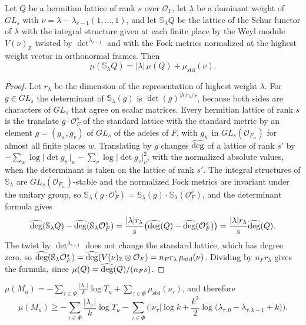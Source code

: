 \begin{lemma}\label{r4:R4:schur}
Let $Q$ be a hermitian lattice of rank $s$ over $\mathcal O_F$, let $\lambda$ be a dominant weight of $GL_s$ with $\nu=\lambda-\lambda_{s-1}(1,\dots,1)$, and let $\mathbb S_\lambda Q$ be the lattice of the Schur functor of $\lambda$ with the integral structure given at each finite place by the Weyl module $V(\nu)_{\mathbb Z}$ twisted by $\det^{\lambda_{s-1}}$ and with the Fock metrics normalized at the highest weight vector in orthonormal frames. Then
\[
\mu(\mathbb S_\lambda Q)=\lvert\lambda\rvert\,\mu(Q)+\mu_{\mathrm{std}}(\nu).
\]
\end{lemma}

\begin{proof}
Let $r_\lambda$ be the dimension of the representation of highest weight $\lambda$. For $g\in GL_s$ the determinant of $\mathbb S_\lambda(g)$ is $\det(g)^{\lvert\lambda\rvert r_\lambda/s}$, because both sides are characters of $GL_s$ that agree on scalar matrices. Every hermitian lattice of rank $s$ is the translate $g\cdot\mathcal O_F^s$ of the standard lattice with the standard metric by an element $g=(g_w,g_v)$ of $GL_s$ of the adeles of $F$, with $g_w$ in $GL_s(\mathcal O_{F_w})$ for almost all finite places $w$. Translating by $g$ changes $\widehat{\deg}$ of a lattice of rank $s'$ by $-\sum_w\log\lvert\det g_w\rvert_w-\sum_v\log\lvert\det g_v\rvert_v^2$, with the normalized absolute values, when the determinant is taken on the lattice of rank $s'$. The integral structures of $\mathbb S_\lambda$ are $GL_s(\mathcal O_{F_w})$-stable and the normalized Fock metrics are invariant under the unitary group, so $\mathbb S_\lambda(g\cdot\mathcal O_F^s)=\mathbb S_\lambda(g)\cdot\mathbb S_\lambda(\mathcal O_F^s)$, and the determinant formula gives
\[
\widehat{\deg}(\mathbb S_\lambda Q)-\widehat{\deg}(\mathbb S_\lambda\mathcal O_F^s)=\frac{\lvert\lambda\rvert r_\lambda}{s}\big(\widehat{\deg}(Q)-\widehat{\deg}(\mathcal O_F^s)\big)=\frac{\lvert\lambda\rvert r_\lambda}{s}\widehat{\deg}(Q).
\]
The twist by $\det^{\lambda_{s-1}}$ does not change the standard lattice, which has degree zero, so $\widehat{\deg}(\mathbb S_\lambda\mathcal O_F^s)=\widehat{\deg}(V(\nu)_{\mathbb Z}\otimes\mathcal O_F)=n_Fr_\lambda\,\mu_{\mathrm{std}}(\nu)$. Dividing by $n_Fr_\lambda$ gives the formula, since $\mu(Q)=\widehat{\deg}(Q)/(n_Fs)$.
\end{proof}

\begin{proposition}\label{r4:R4:Mslope}
$\mu(M_u)=-\sum_{\tau\in\Phi}\frac{\lvert\lambda_\tau\rvert}k\log T_u+\sum_{\tau\in\Phi}\mu_{\mathrm{std}}(\nu_\tau)$, and therefore
\[
\mu(M_u)\ge-\sum_{\tau\in\Phi}\frac{\lvert\lambda_\tau\rvert}k\log T_u-\sum_{\tau\in\Phi}\Big(\lvert\nu_\tau\rvert\log k+\frac{k^2}2\log\big(\lambda_{\tau,0}-\lambda_{\tau,k-1}+k\big)\Big).
\]
\end{proposition}

